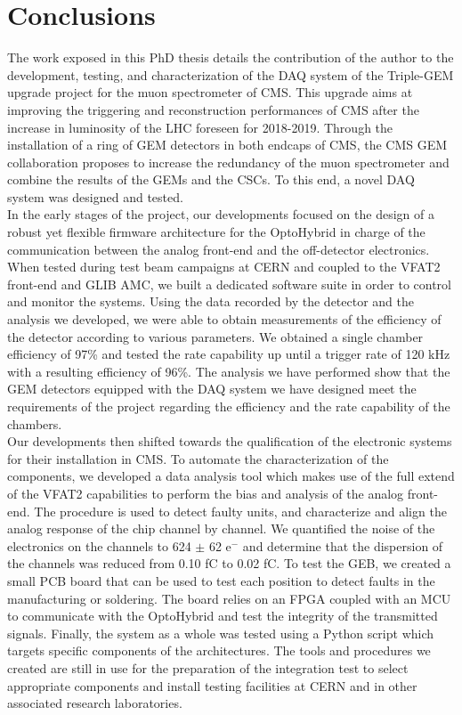 \chapter*{Conclusions}
\label{chap:IV-0-conclusions}

  The work exposed in this PhD thesis details the contribution of the author to the development, testing, and characterization of the DAQ system of the Triple-GEM upgrade project for the muon spectrometer of CMS. This upgrade aims at improving the triggering and reconstruction performances of CMS after the increase in luminosity of the LHC foreseen for 2018-2019. Through the installation of a ring of GEM detectors in both endcaps of CMS, the CMS GEM collaboration proposes to increase the redundancy of the muon spectrometer and combine the results of the GEMs and the CSCs. To this end, a novel DAQ system was designed and tested. \\

  In the early stages of the project, our developments focused on the design of a robust yet flexible firmware architecture for the OptoHybrid in charge of the communication between the analog front-end and the off-detector electronics. When tested during test beam campaigns at CERN and coupled to the VFAT2 front-end and GLIB AMC, we built a dedicated software suite in order to control and monitor the systems. Using the data recorded by the detector and the analysis we developed, we were able to obtain measurements of the efficiency of the detector according to various parameters. We obtained a single chamber efficiency of 97\% and tested the rate capability up until a trigger rate of 120 kHz with a resulting efficiency of 96\%. The analysis we have performed show that the GEM detectors equipped with the DAQ system we have designed meet the requirements of the project regarding the efficiency and the rate capability of the chambers. \\

  Our developments then shifted towards the qualification of the electronic systems for their installation in CMS. To automate the characterization of the components, we developed a data analysis tool which makes use of the full extend of the VFAT2 capabilities to perform the bias and analysis of the analog front-end. The procedure is used to detect faulty units, and characterize and align the analog response of the chip channel by channel. We quantified the noise of the electronics on the channels to 624 $\pm$ 62 e$^-$ and determine that the dispersion of the channels was reduced from 0.10 fC to 0.02 fC. To test the GEB, we created a small PCB board that can be used to test each position to detect faults in the manufacturing or soldering. The board relies on an FPGA coupled with an MCU to communicate with the OptoHybrid and test the integrity of the transmitted signals. Finally, the system as a whole was tested using a Python script which targets specific components of the architectures. The tools and procedures we created are still in use for the preparation of the integration test to select appropriate components and install testing facilities at CERN and in other associated research laboratories. \\

